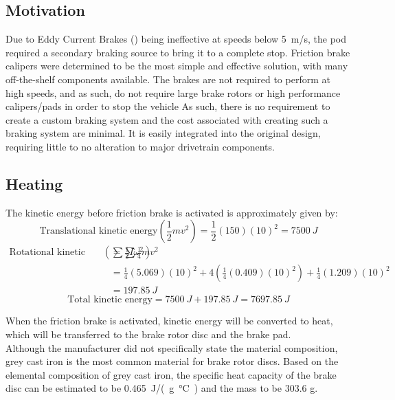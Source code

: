 \documentclass[main.tex]{subfiles}
\begin{document}
    \subsection{Motivation}
    Due to Eddy Current Brakes () being ineffective at speeds below \SI{5}{m/s}, the pod required a secondary braking source to bring it to a complete stop. Friction brake calipers were determined to be the most simple and effective solution, with many off-the-shelf components available. The brakes are not required to perform at high speeds, and as such, do not require large brake rotors or high performance calipers/pads in order to stop the vehicle  As such, there is no requirement to create a custom braking system and the cost associated with creating such a braking system are minimal. It is easily integrated into the original design, requiring little to no alteration to major drivetrain components.\\

    \subsection{Heating}
    The kinetic energy before friction brake is activated is approximately given by:\\
    \[
    	\textrm{Translational kinetic energy} \left(\frac{1}{2}mv^2\right) =\frac{1}{2}(150)(10)^2=\SI{7500}{J}
    \]
    \begin{align*}
	\textrm{Rotational kinetic energy} \left(\sum\frac{1}{2}I{\omega}^2\right)&=\sum\frac{1}{4}mv^2 \\
    &= \frac{1}{4}(5.069)(10)^2 + 4\left(\frac{1}{4}(0.409)(10)^2\right) + \frac{1}{4}(1.209)(10)^2\\
    &= \SI{197.85}{J}
    \end{align*}
    \[
    	\textrm{Total kinetic energy} = \SI{7500}{J} + \SI{197.85}{J} = \SI{7697.85}{J}
    \]

    When the friction brake is activated, kinetic energy will be converted to heat, which will be transferred to the brake rotor disc and the brake pad.\\

    Although the manufacturer did not specifically state the material composition, grey cast iron is the most common material for brake rotor discs. Based on the elemental composition of grey cast iron, the specific heat capacity of the brake disc can be estimated to be \SI{0.465}{J/(g\celsius)} and the mass to be 303.6 g.\\
\end{document}

